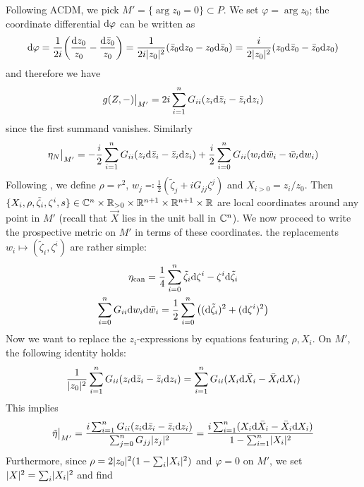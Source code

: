 Following ACDM, we pick $M'=\{\arg z_0=0\} \subset P$. We set $\varphi=\arg z_0$; the coordinate differential $\mathrm{d}\varphi$ can be written as
\begin{equation*}
	\mathrm{d} \varphi=\frac{1}{2i}\bigg(\frac{\mathrm{d} z_0}{z_0}-\frac{\mathrm{d} \bar z_0}{z_0}\bigg)=\frac{1}{2i\lvert z_0 \rvert^2}(\bar z_0\mathrm{d} z_0-z_0\mathrm{d}\bar z_0)=\frac{i}{2\lvert z_0 \rvert^2}(z_0\mathrm{d} \bar z_0-\bar z_0 \mathrm{d} z_0)
\end{equation*}
and therefore we have
\begin{equation*}
	g(Z,-)\big|_{M'}=2i\sum_{i=1}^n G_{ii}(z_i \mathrm{d} \bar z_i - \bar z_i \mathrm{d} z_i)
\end{equation*}
since the first summand vanishes. Similarly 
\begin{equation*}
	\eta_N\big|_{M'}=-\frac{i}{2}\sum_{i=1}^n G_{ii}(z_i \mathrm{d} \bar z_i - \bar z_i \mathrm{d} z_i)
	+\frac{i}{2}\sum_{i=0}^n G_{ii} (w_i \mathrm{d} \bar w_i -\bar w_i \mathrm{d} w_i)
\end{equation*}
Following \cite{ACDM2015,CDS2017}, we define $\rho=r^2$, $w_j\eqqcolon \frac{1}{2}(\tilde \zeta_j+iG_{jj}\zeta^j)$ and $X_{i>0}=z_i/z_0$. Then $\{X_i,\rho,\tilde\zeta_i,\zeta^i,s\}\in \mathbb{C}^n \times \mathbb{R}_{>0}\times \mathbb{R}^{n+1}\times \mathbb{R}^{n+1}\times \mathbb{R}$ are local coordinates around any point in $M'$ (recall that $\vec X$ lies in the unit ball in $\mathbb{C}^n$). We now proceed to write the prospective metric on $M'$ in terms of these coordinates. the replacements $w_i\mapsto (\tilde\zeta_i,\zeta^i)$ are rather simple: 
\begin{gather}
	\eta_\text{can}=\frac{1}{4}\sum_{i=0}^n \tilde \zeta_i \mathrm{d} \zeta^i-\zeta^i \mathrm{d} \tilde \zeta_i\\
	\sum_{i=0}^n G_{ii} \mathrm{d} w_i \mathrm{d} \bar w_i
	=\frac{1}{2}\sum_{i=0}^n \big((\mathrm{d} \tilde\zeta_i)^2+(\mathrm{d} \zeta^i)^2\big)
\end{gather}
Now we want to replace the $z_i$-expressions by equations featuring $\rho,X_i$. On $M'$, the following identity holds:
\begin{equation*}
	\frac{1}{\lvert z_0 \rvert^2}\sum_{i=1}^n G_{ii} (z_i \mathrm{d} \bar z_i - \bar z_i \mathrm{d} z_i)
	=\sum_{i=1}^n G_{ii}(X_i \mathrm{d} \bar X_i - \bar X_i \mathrm{d} X_i)
\end{equation*}
This implies
\begin{equation}
	\tilde\eta\big|_{M'}
	=\frac{i\sum_{i=1}^n G_{ii} (z_i \mathrm{d} \bar z_i - \bar z_i \mathrm{d} z_i)}{\sum_{j=0}^n G_{jj} \lvert z_j \rvert^2}\\
	=\frac{i\sum_{i=1}^n (X_i \mathrm{d} \bar X_i - \bar X_i \mathrm{d} X_i)}{1-\sum_{i=1}^n\lvert X_i \rvert^2}
\end{equation}
Furthermore, since $\rho=2\lvert z_0 \rvert^2(1-\sum_i \lvert X_i \rvert^2)$ and $\varphi=0$ on $M'$, we set $\lvert X \rvert^2=\sum_i \lvert X_i \rvert^2$ and find
